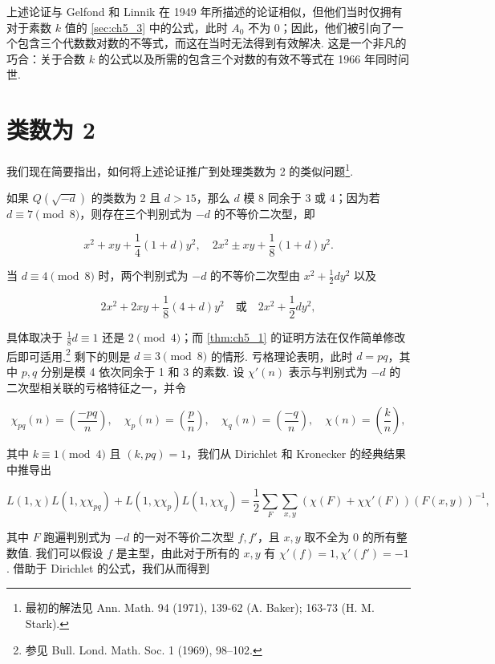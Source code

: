 上述论证与 Gelfond 和 Linnik 在 1949 年所描述的论证相似，但他们当时仅拥有对于素数 $k$ 值的 \autoref{sec:ch5_3} 中的公式，此时 $A_0$ 不为 0；因此，他们被引向了一个包含三个代数数对数的不等式，而这在当时无法得到有效解决. 这是一个非凡的巧合：关于合数 $k$ 的公式以及所需的包含三个对数的有效不等式在 1966 年同时问世.

\section{类数为 2}\label{sec:ch5_5}

我们现在简要指出，如何将上述论证推广到处理类数为 2 的类似问题\footnote{最初的解法见 Ann. Math. 94 (1971), 139-62 (A. Baker); 163-73 (H. M. Stark).}.

如果 $Q(\sqrt{-d})$ 的类数为 2 且 $d > 15$，那么 $d$ 模 8 同余于 3 或 4；因为若 $d \equiv 7 \pmod 8$，则存在三个判别式为 $-d$ 的不等价二次型，即

\[ x^2 + xy + \frac{1}{4}(1+d)y^2, \quad 2x^2 \pm xy + \frac{1}{8}(1+d)y^2. \]

当 $d \equiv 4 \pmod 8$ 时，两个判别式为 $-d$ 的不等价二次型由 $x^2 + \frac{1}{2}dy^2$ 以及

\[ 2x^2 + 2xy + \frac{1}{8}(4+d)y^2 \quad \text{或} \quad 2x^2 + \frac{1}{2}dy^2, \]

具体取决于 $\frac{1}{8}d \equiv 1$ 还是 $2 \pmod 4$；而 \autoref{thm:ch5_1} 的证明方法在仅作简单修改后即可适用.\footnote{参见 Bull. Lond. Math. Soc. 1 (1969), 98--102.} 剩下的则是 $d \equiv 3 \pmod 8$ 的情形. 亏格理论表明，此时 $d = pq$，其中 $p, q$ 分别是模 4 依次同余于 1 和 3 的素数. 设 $\chi'(n)$ 表示与判别式为 $-d$ 的二次型相关联的亏格特征之一，并令

\[\chi_{pq}(n) = \left(\frac{-pq}{n}\right), \quad \chi_p(n) = \left(\frac{p}{n}\right), \quad \chi_q(n) = \left(\frac{-q}{n}\right), \quad \chi(n) = \left(\frac{k}{n}\right),\]

其中 $k \equiv 1 \pmod 4$ 且 $(k, pq) = 1$，我们从 Dirichlet 和 Kronecker 的经典结果中推导出

\[ L(1,\chi)L(1,\chi\chi_{pq}) + L(1,\chi\chi_p)L(1,\chi\chi_q) = \frac{1}{2} \sum_F \sum_{x,y} (\chi(F) + \chi\chi'(F))(F(x,y))^{-1}, \]

其中 $F$ 跑遍判别式为 $-d$ 的一对不等价二次型 $f, f'$，且 $x, y$ 取不全为 0 的所有整数值. 我们可以假设 $f$ 是主型，由此对于所有的 $x, y$ 有 $\chi'(f) = 1, \chi'(f') = -1$. 借助于 Dirichlet 的公式，我们从而得到

